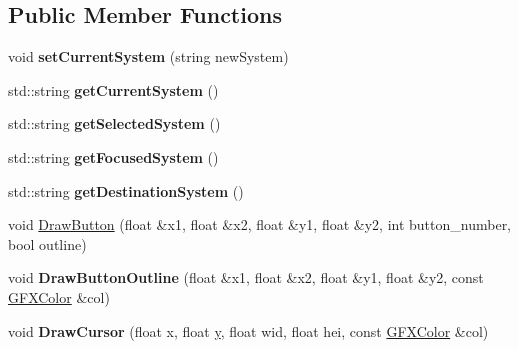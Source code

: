 \subsection*{Public Member Functions}
\begin{DoxyCompactItemize}
\item 
void {\bfseries set\+Current\+System} (string new\+System)\hypertarget{classNavigationSystem_aae2baa6e560bd6590fe3ee974243dde4}{}\label{classNavigationSystem_aae2baa6e560bd6590fe3ee974243dde4}

\item 
std\+::string {\bfseries get\+Current\+System} ()\hypertarget{classNavigationSystem_a6323533ee4f33339722acc0f60a58d55}{}\label{classNavigationSystem_a6323533ee4f33339722acc0f60a58d55}

\item 
std\+::string {\bfseries get\+Selected\+System} ()\hypertarget{classNavigationSystem_a0e2b16d4e1729544c0f224c82d7d6927}{}\label{classNavigationSystem_a0e2b16d4e1729544c0f224c82d7d6927}

\item 
std\+::string {\bfseries get\+Focused\+System} ()\hypertarget{classNavigationSystem_a7c51ae567564c6648ea14225f77b647f}{}\label{classNavigationSystem_a7c51ae567564c6648ea14225f77b647f}

\item 
std\+::string {\bfseries get\+Destination\+System} ()\hypertarget{classNavigationSystem_aca339cb57b2931f37b7294ca51e4cba4}{}\label{classNavigationSystem_aca339cb57b2931f37b7294ca51e4cba4}

\item 
void \hyperlink{classNavigationSystem_aeefeabb0c4f58c24af13fd7a601ef9c5}{Draw\+Button} (float \&x1, float \&x2, float \&y1, float \&y2, int button\+\_\+number, bool outline)
\item 
void {\bfseries Draw\+Button\+Outline} (float \&x1, float \&x2, float \&y1, float \&y2, const \hyperlink{structGFXColor}{G\+F\+X\+Color} \&col)\hypertarget{classNavigationSystem_a1f87a7c28d8c24e11cfdfd99d55ea2fc}{}\label{classNavigationSystem_a1f87a7c28d8c24e11cfdfd99d55ea2fc}

\item 
void {\bfseries Draw\+Cursor} (float x, float \hyperlink{IceUtils_8h_aa7ffaed69623192258fb8679569ff9ba}{y}, float wid, float hei, const \hyperlink{structGFXColor}{G\+F\+X\+Color} \&col)\hypertarget{classNavigationSystem_ab7f249ed0cdf2ac6918c854715f86b1d}{}\label{classNavigationSystem_ab7f249ed0cdf2ac6918c854715f86b1d}


\end{DoxyCompactItemize}
